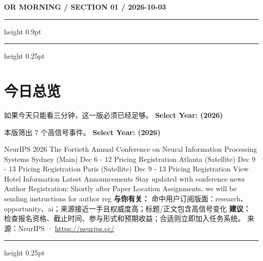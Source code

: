\documentclass[10.5pt]{ctexart}
\begin{document}
{\small\bfseries OR MORNING / SECTION 01 / 2026-10-03}
\vspace{2mm}
\hrule height 0.9pt
\vspace{1.5mm}
\hrule height 0.25pt
\vspace{4mm}
\section*{今日总览}
{\color{ormuted} 如果今天只能看三分钟，这一版必须已经足够。}
\vspace{2mm}
{\fontsize{25}{29}\selectfont\bfseries Select Year: (2026)}\par
\vspace{2mm}
{\large 本版筛出 7 个高信号事件。}
\vspace{3mm}
{\Large\bfseries Select Year: (2026)}\par
NeurIPS 2026 The Fortieth Annual Conference on Neural Information Processing Systems Sydney (Main) Dec 6 - 12 Pricing Registration Atlanta (Satellite) Dec 9 - 13 Pricing Registration Paris (Satellite) Dec 9 - 13 Pricing Registration View Hotel Information Latest Announcements Stay updated with conference news Author Registration: Shortly after Paper Location Assignments, we will be sending instructions for author reg
\textbf{与你有关：} 命中用户订阅版面：research、opportunity、ai；来源接近一手且权威度高；标题/正文包含高信号变化
\textbf{建议：} 检查报名资格、截止时间、参与形式和预期收益；合适则立即加入任务系统。
{\footnotesize\color{ormuted} 来源：NeurIPS · \url{https://neurips.cc/}}
\vspace{3mm}
\hrule height 0.25pt
\vspace{3mm}
\end{document}
